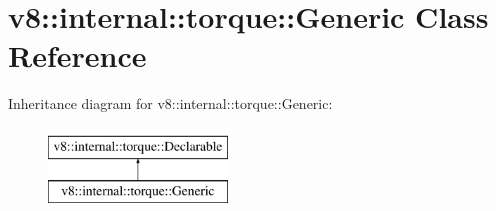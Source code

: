 \hypertarget{classv8_1_1internal_1_1torque_1_1Generic}{}\section{v8\+:\+:internal\+:\+:torque\+:\+:Generic Class Reference}
\label{classv8_1_1internal_1_1torque_1_1Generic}
Inheritance diagram for v8\+:\+:internal\+:\+:torque\+:\+:Generic\+:\begin{figure}[H]
\begin{center}
\leavevmode
\includegraphics[height=2.000000cm]{classv8_1_1internal_1_1torque_1_1Generic}
\end{center}
\end{figure}
